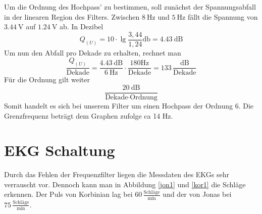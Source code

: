 Um die Ordnung des Hochpass' zu bestimmen, soll zunächst der Spannungsabfall in
der linearen Region des Filters. Zwischen $\SI{8}{\hertz}$ und $\SI{5}{\hertz}$
fällt die Spannung von $\SI{3,44}{\volt}$ auf $\SI{1,24}{\volt}$ ab. In
Dezibel
\[
Q_{(U)} = 10 \cdot \lg \frac{3,44}{1,24} \si{\decibel} = \SI{4,43}{\dB}
\]
Um nun den Abfall pro Dekade zu erhalten, rechnet man
\[
\frac{Q_{(U)} }{\text{Dekade}} = \frac{ \SI{4,43}{\dB} }{ \SI{6}
{\Hz}} \cdot \frac{ 180 \text{Hz} }{\text{Dekade}} = 133 \, \frac{
\si{\dB}}{\text{Dekade}}
\]
Für die Ordnung gilt weiter
\[
\frac{ \SI{20}{\dB} }{\text{Dekade} \cdot \text{Ordnung} }
\]
Somit handelt es sich bei unserem Filter um einen Hochpass der Ordnung 6.
Die Grenzfrequenz beträgt dem Graphen zufolge ca 14 Hz. 

\section{EKG Schaltung}

Durch das Fehlen der Frequenzfilter liegen die Messdaten des EKGs sehr
verrauscht vor. Dennoch kann man in Abbildung \ref{jon1} und \ref{kor1} die
Schläge erkennen. 
Der Puls von Korbinian lag bei $60 \, \frac{ \text{Schläge}}{\text{min}}$ und der von
Jonas bei $75 \, \frac{\text{Schläge}}{\text{min}}$.


